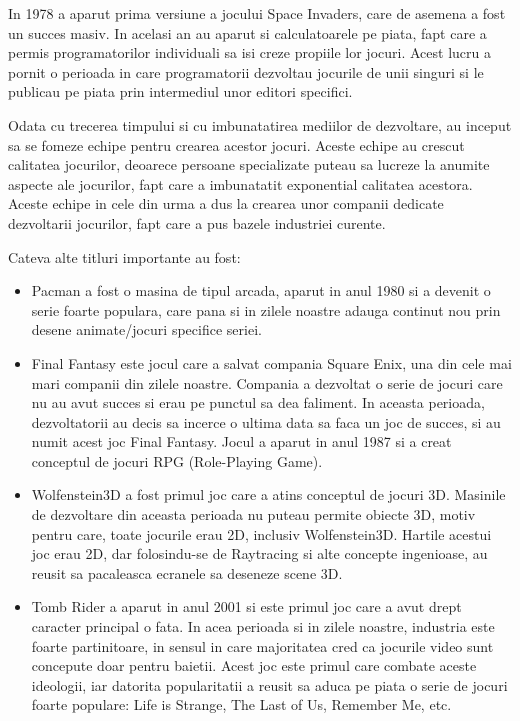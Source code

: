 \documentclass[12pt, a4paper]{article}
\begin{document}
	In 1978 a aparut prima versiune a jocului Space Invaders, care de asemena a fost un succes masiv. In acelasi an au aparut si calculatoarele pe piata, fapt care a permis programatorilor individuali sa isi creze propiile lor jocuri. Acest lucru a pornit o perioada in care programatorii dezvoltau jocurile de unii singuri si le publicau pe piata prin intermediul unor editori specifici.
	\newline
	
	Odata cu trecerea timpului si cu imbunatatirea mediilor de dezvoltare, au inceput sa se fomeze echipe pentru crearea acestor jocuri. Aceste echipe au crescut calitatea jocurilor, deoarece persoane specializate puteau sa lucreze la anumite aspecte ale jocurilor, fapt care a imbunatatit exponential calitatea acestora. Aceste echipe in cele din urma a dus la crearea unor companii dedicate dezvoltarii jocurilor, fapt care a pus bazele industriei curente.
	
	Cateva alte titluri importante au fost:
	
	\begin{itemize}
		\item Pacman a fost o masina de tipul arcada, aparut in anul 1980 si a devenit o serie foarte populara, care pana si in zilele noastre adauga continut nou prin desene animate/jocuri specifice seriei.
		\item Final Fantasy este jocul care a salvat compania Square Enix, una din cele mai mari companii din zilele noastre. Compania a dezvoltat o serie de jocuri care nu au avut succes si erau pe punctul sa dea faliment. In aceasta perioada, dezvoltatorii au decis sa incerce o ultima data sa faca un joc de succes, si au numit acest joc Final Fantasy. Jocul a aparut in anul 1987 si a creat conceptul de jocuri RPG (Role-Playing Game).
		\item Wolfenstein3D a fost primul joc care a atins conceptul de jocuri 3D. Masinile de dezvoltare din aceasta perioada nu puteau permite obiecte 3D, motiv pentru care, toate jocurile erau 2D, inclusiv Wolfenstein3D. Hartile acestui joc erau 2D, dar folosindu-se de Raytracing si alte concepte ingenioase, au reusit sa pacaleasca ecranele sa deseneze scene 3D.
		\item Tomb Rider a aparut in anul 2001 si este primul joc care a avut drept caracter principal o fata. In acea perioada si in zilele noastre, industria este foarte partinitoare, in sensul in care majoritatea cred ca jocurile video sunt concepute doar pentru baietii. Acest joc este primul care combate aceste ideologii, iar datorita popularitatii a reusit sa aduca pe piata o serie de jocuri foarte populare: Life is Strange, The Last of Us, Remember Me, etc.
	\end{itemize}	
\end{document}
